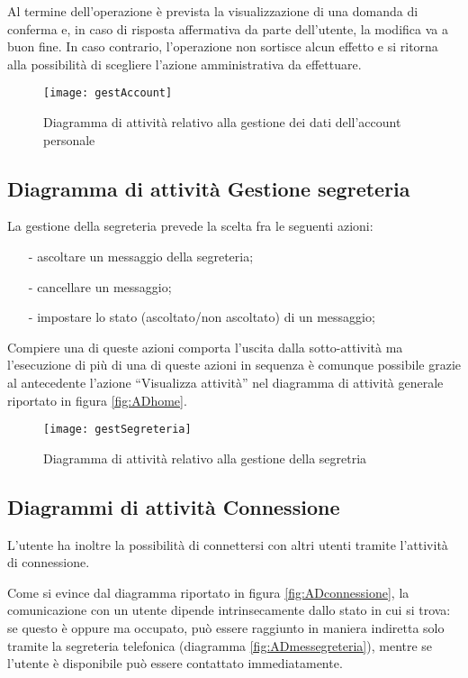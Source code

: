 Al termine dell'operazione è prevista la visualizzazione di una domanda di conferma e, in caso di risposta affermativa da parte dell'utente, la modifica va a buon fine. In caso contrario, l'operazione non sortisce alcun effetto e si ritorna alla possibilità di scegliere l'azione amministrativa da effettuare.

\begin{figure}[H]
  \centering
  \texttt{[image: gestAccount]}
  \caption{Diagramma di attività relativo alla gestione dei dati dell'account personale}\label{fig:ADgestioneaccount}
\end{figure}

\subsection{Diagramma di attività Gestione segreteria}
La gestione della segreteria prevede la scelta fra le seguenti azioni:
\begin{itemize}[noitemsep,nolistsep]
 \item[-] ascoltare un messaggio della segreteria;
 \item[-] cancellare un messaggio;
 \item[-] impostare lo stato (ascoltato/non ascoltato) di un messaggio;
\end{itemize}

Compiere una di queste azioni comporta l'uscita dalla sotto-attività ma l'esecuzione di più di una di queste azioni in sequenza è comunque possibile grazie al  antecedente l'azione ``Visualizza attività'' nel diagramma di attività generale riportato in figura \vref{fig:ADhome}.

\begin{figure}[H]
  \centering
  \texttt{[image: gestSegreteria]}
  \caption{Diagramma di attività relativo alla gestione della segretria}\label{fig:ADgestionesegreteria}
\end{figure}

\subsection{Diagrammi di attività Connessione}
L'utente ha inoltre la possibilità di connettersi con altri utenti tramite l'attività di connessione.

Come si evince dal diagramma riportato in figura \vref{fig:ADconnessione}, la comunicazione con un utente dipende intrinsecamente dallo stato in cui si trova: se questo è  oppure  ma occupato, può essere raggiunto in maniera indiretta solo tramite la segreteria telefonica (diagramma \ref{fig:ADmessegreteria}), mentre se l'utente è disponibile può essere contattato immediatamente.

